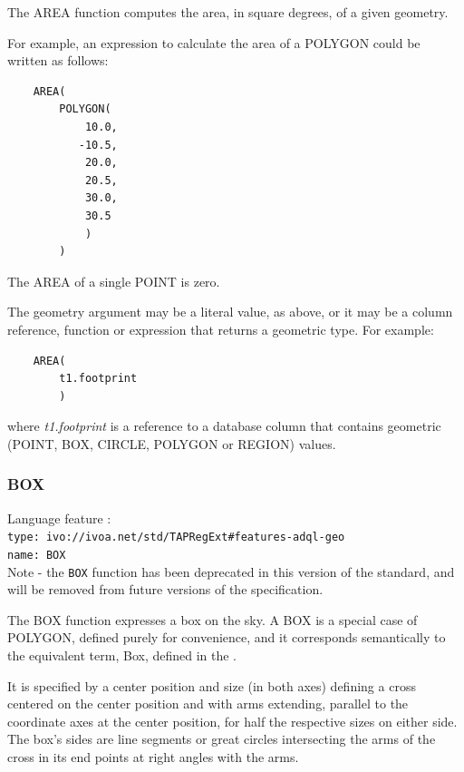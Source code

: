 \documentclass[11pt,a4paper]{ivoa}
\begin{document}
The AREA function computes the area, in square degrees, of a given geometry.

For example, an expression to calculate the area of a POLYGON could be
written as follows:
\begin{verbatim}
    AREA(
        POLYGON(
            10.0,
           -10.5,
            20.0,
            20.5,
            30.0,
            30.5
            )
        )
\end{verbatim}

The AREA of a single POINT is zero.

The geometry argument may be a literal value, as above, or it may be a
column reference, function or expression that returns a geometric type.
For example:
\begin{verbatim}
    AREA(
        t1.footprint
        )
\end{verbatim}
where \textit{t1.footprint} is a reference to a database column that
contains geometric (POINT, BOX, CIRCLE, POLYGON or REGION) values.

\subsubsection{BOX}
\label{sec:functions.geom.box}
{\footnotesize Language feature :}\\
{\footnotesize \verb|type: ivo://ivoa.net/std/TAPRegExt#features-adql-geo|}\\
{\footnotesize \verb|name: BOX|}\\

Note - the \verb|BOX| function has been deprecated in this version of the standard,
and will be removed from future versions of the specification.

The BOX function expresses a box on the sky. A BOX is a special case of POLYGON,
defined purely for convenience,
and it corresponds semantically to the equivalent term, Box, defined in
the \STCSpec.

It is specified by a center position and size
(in both axes) defining a cross centered on the center position and
with arms extending, parallel to the coordinate axes at the center position,
for half the respective sizes on either side. The box’s sides are line
segments or great circles intersecting the arms of the cross in its end
points at right angles with the arms.

\end{document}
